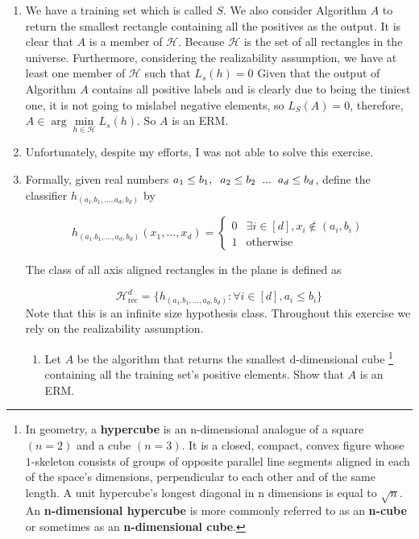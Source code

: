\documentclass[]{book}
\theoremstyle{definition}
\begin{document}
\begin{enumerate}
    \item We have a training set which is called $S$. We also consider Algorithm $A$ to return the smallest rectangle containing all the positives as the output. It is clear that $A$ is a member of $\mathcal{H}$. Because $\mathcal{H}$ is the set of all rectangles in the universe. Furthermore, considering the  realizability assumption, we have at least one member of $\mathcal{H}$ such that $ L_s (h) = 0 $ Given that the output of Algorithm $A$ contains all positive labels and is clearly due to being the tiniest one, it is not going to mislabel negative elements, so $ L_S (A) = 0 $, therefore, $A \in \arg \underset{h \in \mathcal{H}}{\min} L_s(h)$. So $A$ is an ERM.
    \item Unfortunately, despite my efforts, I was not able to solve this exercise.
    \item Formally, given real numbers $a_1 \leq b_1, \hspace{0.2 cm} a_2 \leq b_2 \hspace{0.2 cm} ... \hspace{0.2 cm} a_d \leq b_d $, define the classifier $h_{(a_1.b_1,...,a_d,b_d)}$ by

\begin{equation*}
  h_{(a_1.b_1,...,a_d,b_d)}(x_1,...,x_d)= \left\{\begin{matrix}
0 & \exists i \in [d] , x_i \notin (a_i,b_i)  \\ 
1 & \text{otherwise}
\end{matrix}\right. 
\end{equation*}

The class of all axis aligned rectangles in the plane is defined as

\begin{equation*}
    \mathcal{H}_{\text{rec}}^d=\{ h_{(a_1.b_1,...,a_d,b_d)}:\forall i \in [d],a_i \leq b_i\}
\end{equation*}
    Note that this is an infinite size hypothesis class. Throughout this exercise we rely
on the realizability assumption.
 
 \begin{enumerate}[I]
  \item Let $A$ be the algorithm that returns the smallest d-dimensional cube
  \footnote{In geometry, a \textbf{hypercube} is an n-dimensional analogue of a square $(n = 2)$ and a cube $(n = 3)$. It is a closed, compact, convex figure whose $1$-skeleton consists of groups of opposite parallel line segments aligned in each of the space's dimensions, perpendicular to each other and of the same length. A unit hypercube's longest diagonal in n dimensions is equal to ${ {\sqrt {n}}.}$
  An \textbf{n-dimensional hypercube} is more commonly referred to as an \textbf{n-cube} or sometimes as an \textbf{n-dimensional cube}.
  }
 containing all the training set's positive elements. Show that $A$ is an ERM.
  

\end{enumerate}
\end{enumerate}
\end{document}
